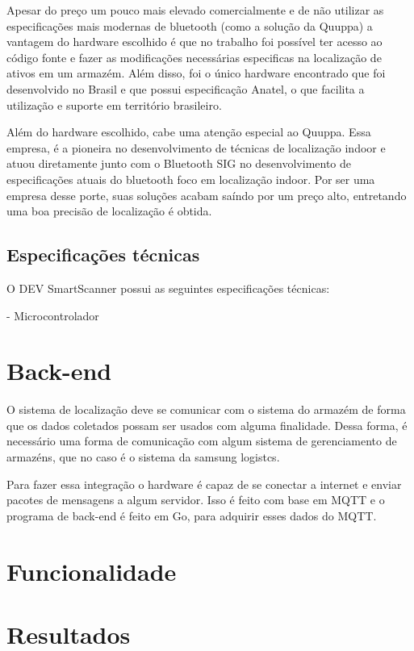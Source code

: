 Apesar do preço um pouco mais elevado comercialmente e de não utilizar as especificações mais modernas de bluetooth (como a solução da Quuppa) a vantagem do hardware escolhido é que no trabalho foi possível ter acesso ao código fonte e fazer as modificações necessárias especificas na localização de ativos em um armazém. Além disso, foi o único hardware encontrado que foi desenvolvido no Brasil e que possui especificação Anatel, o que facilita a utilização e suporte em território brasileiro.

Além do hardware escolhido, cabe uma atenção especial ao Quuppa. Essa empresa, é a pioneira no desenvolvimento de técnicas de localização indoor e atuou diretamente junto com o Bluetooth SIG no desenvolvimento de especificações atuais do bluetooth foco em localização indoor. Por ser uma empresa desse porte, suas soluções acabam saíndo por um preço alto, entretando uma boa precisão de localização é obtida.

\subsection{Especificações técnicas}
O DEV SmartScanner possui as seguintes especificações técnicas:


- Microcontrolador

\section{Back-end}
O sistema de localização deve se comunicar com o sistema do armazém de forma que os dados coletados possam ser usados com alguma finalidade. Dessa forma, é necessário uma forma de comunicação com algum sistema de gerenciamento de armazéns, que no caso é o sistema da samsung logistcs.

Para fazer essa integração o hardware é capaz de se conectar a internet e enviar pacotes de mensagens a algum servidor. Isso é feito com base em MQTT e o programa de back-end é feito em Go, para adquirir esses dados do MQTT.



\section{Funcionalidade}
\section{Resultados}
